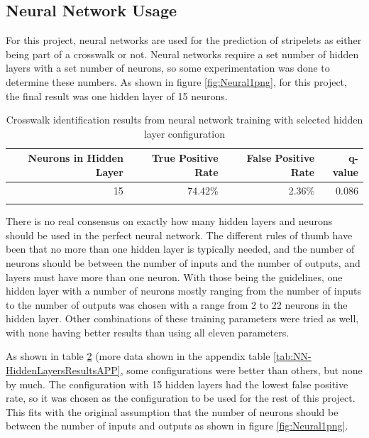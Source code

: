 \documentclass[12pt]{ucthesis}
\begin{document}
\subsection{Neural Network Usage}
For this project, neural networks are used for the prediction of stripelets as either being part of a crosswalk or not. Neural networks require a set number of hidden layers with a set number of neurons, so some experimentation was done to determine these numbers. As shown in figure \ref{fig:Neural1png}, for this project, the final result was one hidden layer of 15 neurons. 

    \begin{table}[t]
        \begin{longtable}{| r | r | r | r |}
        \hline
        Neurons in Hidden Layer & True Positive Rate & False Positive Rate & q-value \bigstrut\\
        \hline
        15 & 74.42\% & 2.36\% & 0.086 \bigstrut\\
        \hline
        \caption[Selected Neural Network Configuration Results]{Crosswalk identification results from neural network training with selected hidden layer configuration}
        \label{tab:NN-HiddenLayersResults} 
        \end{longtable}
    \end{table}

There is no real consensus on exactly how many hidden layers and neurons should be used in the perfect neural network. The different rules of thumb\cite{Heaton:2008:INN:1502373} have been that no more than one hidden layer is typically needed, and the number of neurons should be between the number of inputs and the number of outputs, and layers must have more than one neuron. With those being the guidelines, one hidden layer with a number of neurons mostly ranging from the number of inputs to the number of outputs was chosen with a range from 2 to 22 neurons in the hidden layer. Other combinations of these training parameters were tried as well, with none having better results than using all eleven parameters. 



As shown in table \ref{tab:NN-HiddenLayersResults} (more data shown in the appendix table \ref{tab:NN-HiddenLayersResultsAPP}, some configurations were better than others, but none by much. The configuration with 15 hidden layers had the lowest false positive rate, so it was chosen as the configuration to be used for the rest of this project. This fits with the original assumption that the number of neurons should be between the number of inputs and outputs as shown in figure \ref{fig:Neural1png}. 
\end{document}
